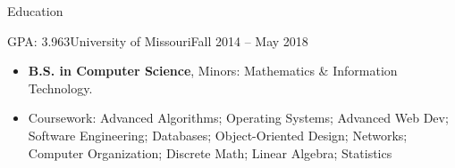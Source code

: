 \documentclass[]{mcdowellcv}
\begin{document}
    \makeheader
    
    \begin{cvsection}{Education}
        \begin{cvsubsection}{GPA: 3.963}{University of Missouri}{Fall 2014 -- May 2018}
            \begin{itemize}
                \item \textbf{B.S. in Computer Science}, Minors: Mathematics \& Information Technology.
                \item Coursework: Advanced Algorithms; Operating Systems; Advanced Web Dev; Software Engineering; Databases; Object-Oriented Design; Networks; Computer Organization; Discrete Math; Linear Algebra; Statistics
            \end{itemize}
        \end{cvsubsection}
    \end{cvsection}
    
\end{document}

